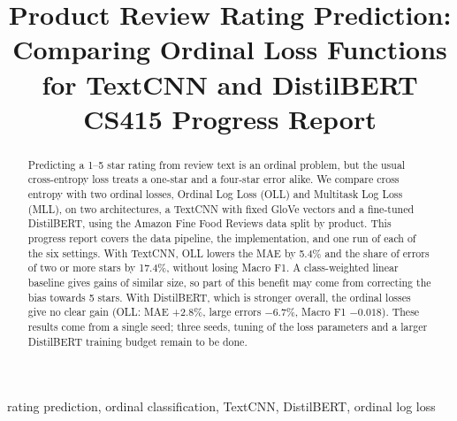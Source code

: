 \documentclass[conference]{IEEEtran}
\begin{document}
\title{Product Review Rating Prediction:\\
Comparing Ordinal Loss Functions for TextCNN and DistilBERT\\
\large CS415 Progress Report}

\author{
\and
{}
\and
{}
}

\maketitle

\begin{abstract}
Predicting a 1--5 star rating from review text is an ordinal problem, but the usual cross-entropy loss treats a one-star and a four-star error alike. We compare cross entropy with two ordinal losses, Ordinal Log Loss (OLL) and Multitask Log Loss (MLL), on two architectures, a TextCNN with fixed GloVe vectors and a fine-tuned DistilBERT, using the Amazon Fine Food Reviews data split by product. This progress report covers the data pipeline, the implementation, and one run of each of the six settings. With TextCNN, OLL lowers the MAE by 5.4\% and the share of errors of two or more stars by 17.4\%, without losing Macro F1. A class-weighted linear baseline gives gains of similar size, so part of this benefit may come from correcting the bias towards 5 stars. With DistilBERT, which is stronger overall, the ordinal losses give no clear gain (OLL: MAE +2.8\%, large errors $-6.7\%$, Macro F1 $-0.018$). These results come from a single seed; three seeds, tuning of the loss parameters and a larger DistilBERT training budget remain to be done.
\end{abstract}

\begin{IEEEkeywords}
rating prediction, ordinal classification, TextCNN, DistilBERT, ordinal log loss
\end{IEEEkeywords}









\end{document}
